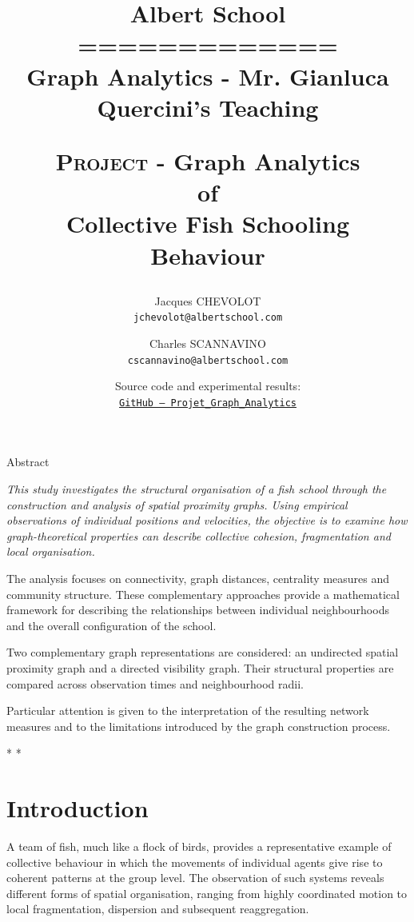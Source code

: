 \documentclass[10pt,a4paper]{article}
\title{
{\Large \sc Albert School}\\
=============\\
{\Large \sc Graph Analytics - Mr. Gianluca Quercini's Teaching}\\
\begin{TexteBleu}
{{\Large \scshape Project} -
{\LARGE Graph Analytics\\of\\Collective Fish Schooling Behaviour}}
\end{TexteBleu}
}
\author{
Jacques CHEVOLOT\\
\texttt{jchevolot@albertschool.com}
\and
Charles SCANNAVINO\\
\texttt{cscannavino@albertschool.com}
}
\date{
\small
Source code and experimental results:\\
\href{https://github.com/Charles-Scannavino/Projet_Graph_Analytics}
{\texttt{GitHub -- Projet\_Graph\_Analytics}}
}
\newcommand{\esp}{\vspace*{2\bigskipamount}}
\begin{document}
\maketitle



\begin{center}
{\sc Abstract}
\end{center}

{\it This study investigates the structural organisation of a fish
school through the construction and analysis of spatial
proximity graphs. Using empirical observations of individual
positions and velocities, the objective is to examine how
graph-theoretical properties can describe collective cohesion,
fragmentation and local organisation.

The analysis focuses on connectivity, graph distances,
centrality measures and community structure. These
complementary approaches provide a mathematical framework
for describing the relationships between individual
neighbourhoods and the overall configuration of the school.

Two complementary graph representations are considered:
an undirected spatial proximity graph and a directed
visibility graph. Their structural properties are compared
across observation times and neighbourhood radii.

Particular attention is given to the interpretation of the
resulting network measures and to the limitations introduced
by the graph construction process.}

\esp

\begin{center}
{\Large *   *   *}
\end{center}

\tableofcontents

\clearpage


\section{Introduction}

A team of fish, much like a flock of birds, provides a
representative example of collective behaviour in which the
movements of individual agents give rise to coherent patterns
at the group level. The observation of such systems reveals
different forms of spatial organisation, ranging from highly
coordinated motion to local fragmentation, dispersion and
subsequent reaggregation.
\end{document}
